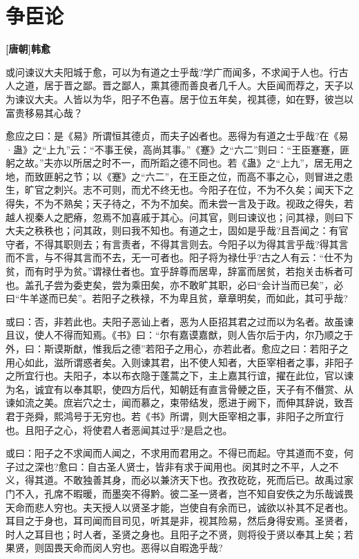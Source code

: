 \documentclass[UTF8,titlepage,oneside]{ctexbook}
\begin{document}
\chapter*{争臣论}
\begin{center}
	\textbf{[唐朝]韩愈}
\end{center}

或问谏议大夫阳城于愈，可以为有道之士乎哉?学广而闻多，不求闻于人也。行古人之道，居于晋之鄙。晋之鄙人，熏其德而善良者几千人。大臣闻而荐之，天子以为谏议大夫。人皆以为华，阳子不色喜。居于位五年矣，视其德，如在野，彼岂以富贵移易其心哉？

愈应之曰：是《易》所谓恒其德贞，而夫子凶者也。恶得为有道之士乎哉?在《易·蛊》之“上九”云：“不事王侯，高尚其事。”《蹇》之“六二”则曰：“王臣蹇蹇，匪躬之故。”夫亦以所居之时不一，而所蹈之德不同也。若《蛊》之“上九”，居无用之地，而致匪躬之节；以《蹇》之“六二”，在王臣之位，而高不事之心，则冒进之患生，旷官之刺兴。志不可则，而尤不终无也。今阳子在位，不为不久矣；闻天下之得失，不为不熟矣；天子待之，不为不加矣。而未尝一言及于政。视政之得失，若越人视秦人之肥瘠，忽焉不加喜戚于其心。问其官，则曰谏议也；问其禄，则曰下大夫之秩秩也；问其政，则曰我不知也。有道之士，固如是乎哉?且吾闻之：有官守者，不得其职则去；有言责者，不得其言则去。今阳子以为得其言乎哉?得其言而不言，与不得其言而不去，无一可者也。阳子将为禄仕乎?古之人有云：“仕不为贫，而有时乎为贫。”谓禄仕者也。宜乎辞尊而居卑，辞富而居贫，若抱关击柝者可也。盖孔子尝为委吏矣，尝为乘田矣，亦不敢旷其职，必曰“会计当而已矣”，必曰“牛羊遂而已矣”。若阳子之秩禄，不为卑且贫，章章明矣，而如此，其可乎哉?

或曰：否，非若此也。夫阳子恶讪上者，恶为人臣招其君之过而以为名者。故虽谏且议，使人不得而知焉。《书》曰：“尔有嘉谟嘉猷，则人告尔后于内，尔乃顺之于外，曰：斯谟斯猷，惟我后之德”若阳子之用心，亦若此者。愈应之曰：若阳子之用心如此，滋所谓惑者矣。入则谏其君，出不使人知者，大臣宰相者之事，非阳子之所宜行也。夫阳子，本以布衣隐于蓬蒿之下，主上嘉其行谊，擢在此位，官以谏为名，诚宜有以奉其职，使四方后代，知朝廷有直言骨鲠之臣，天子有不僭赏、从谏如流之美。庶岩穴之士，闻而慕之，束带结发，愿进于阙下，而伸其辞说，致吾君于尧舜，熙鸿号于无穷也。若《书》所谓，则大臣宰相之事，非阳子之所宜行也。且阳子之心，将使君人者恶闻其过乎?是启之也。

或曰：阳子之不求闻而人闻之，不求用而君用之。不得已而起。守其道而不变，何子过之深也?愈曰：自古圣人贤士，皆非有求于闻用也。闵其时之不平，人之不义，得其道。不敢独善其身，而必以兼济天下也。孜孜矻矻，死而后已。故禹过家门不入，孔席不暇暖，而墨突不得黔。彼二圣一贤者，岂不知自安佚之为乐哉诚畏天命而悲人穷也。夫天授人以贤圣才能，岂使自有余而已，诚欲以补其不足者也。耳目之于身也，耳司闻而目司见，听其是非，视其险易，然后身得安焉。圣贤者，时人之耳目也；时人者，圣贤之身也。且阳子之不贤，则将役于贤以奉其上矣；若果贤，则固畏天命而闵人穷也。恶得以自暇逸乎哉?
\end{document}
